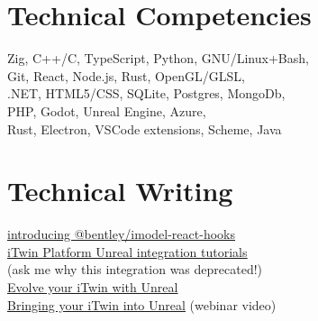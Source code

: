 \documentclass[Letterpaper,11pt]{article}
\newcommand\link[2]{\href{#1}{\underline{#2}}}
\begin{document}
\begin{multicols}{2}

    \section*{Technical Competencies}
        Zig, C++/C, TypeScript, Python, GNU/Linux+Bash,
        \\
        Git, React, Node.js, Rust, OpenGL/GLSL,
        \\
        .NET, HTML5/CSS, SQLite, Postgres, MongoDb,
        \\ 
        PHP, Godot, Unreal Engine, Azure,
        \\
        Rust, Electron, VSCode extensions, Scheme, Java

    \section*{Technical Writing}
        \link{https://medium.com/itwinjs/introducing-bentley-imodel-react-hooks-8945a72711d2}{introducing @bentley/imodel-react-hooks}
        \\
        \link{https://web.archive.org/web/20220926063257/https://developer.bentley.com/tutorials/itwin-unreal-controlling-your-imodel/}{iTwin Platform Unreal integration tutorials}
        \\
        (ask me why this integration was deprecated!)
        \\
        \link{https://medium.com/itwinjs/evolve-your-itwin-with-unreal-45206afe19f4}{Evolve your iTwin with Unreal}
        \\
    \link{https://www.youtube.com/watch?v=IV0eBECws1k&t=130s}{Bringing your iTwin into Unreal} (webinar video)

\end{multicols}

\clearpage
\end{document}

